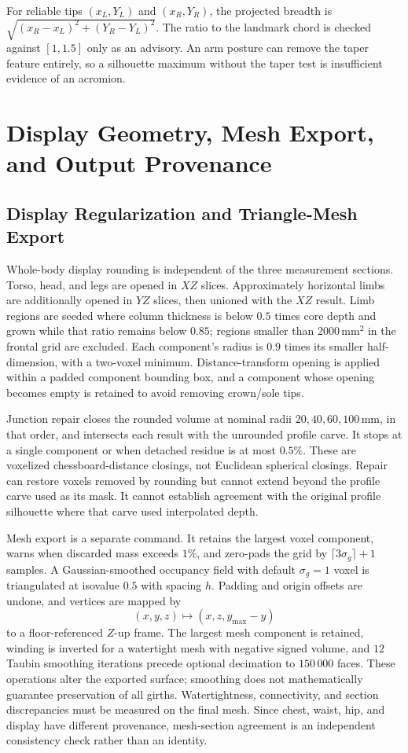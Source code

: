 \documentclass[11pt,a4paper]{article}
\numberwithin{equation}{section}
\begin{document}
For reliable tips $(x_L,Y_L)$ and $(x_R,Y_R)$, the projected breadth is $\sqrt{(x_R-x_L)^2+(Y_R-Y_L)^2}$. The ratio to the landmark chord is checked against $[1,1.5]$ only as an advisory. An arm posture can remove the taper feature entirely, so a silhouette maximum without the taper test is insufficient evidence of an acromion.

\section{Display Geometry, Mesh Export, and Output Provenance}
\subsection{Display Regularization and Triangle-Mesh Export}
\label{subsec:mesh_export}
Whole-body display rounding is independent of the three measurement sections. Torso, head, and legs are opened in $XZ$ slices. Approximately horizontal limbs are additionally opened in $YZ$ slices, then unioned with the $XZ$ result. Limb regions are seeded where column thickness is below $0.5$ times core depth and grown while that ratio remains below $0.85$; regions smaller than $2000$\,mm$^2$ in the frontal grid are excluded. Each component's radius is $0.9$ times its smaller half-dimension, with a two-voxel minimum. Distance-transform opening is applied within a padded component bounding box, and a component whose opening becomes empty is retained to avoid removing crown/sole tips.

Junction repair closes the rounded volume at nominal radii $20,40,60,100$\,mm, in that order, and intersects each result with the unrounded profile carve. It stops at a single component or when detached residue is at most $0.5\%$. These are voxelized chessboard-distance closings, not Euclidean spherical closings. Repair can restore voxels removed by rounding but cannot extend beyond the profile carve used as its mask. It cannot establish agreement with the original profile silhouette where that carve used interpolated depth.

Mesh export is a separate command. It retains the largest voxel component, warns when discarded mass exceeds $1\%$, and zero-pads the grid by $\lceil3\sigma_g\rceil+1$ samples. A Gaussian-smoothed occupancy field with default $\sigma_g=1$ voxel is triangulated at isovalue $0.5$ with spacing $h$. Padding and origin offsets are undone, and vertices are mapped by
\begin{equation}
(x,y,z)\mapsto(x,z,y_{\max}-y)
\end{equation}
to a floor-referenced $Z$-up frame. The largest mesh component is retained, winding is inverted for a watertight mesh with negative signed volume, and $12$ Taubin smoothing iterations precede optional decimation to $150\,000$ faces. These operations alter the exported surface; smoothing does not mathematically guarantee preservation of all girths. Watertightness, connectivity, and section discrepancies must be measured on the final mesh. Since chest, waist, hip, and display have different provenance, mesh-section agreement is an independent consistency check rather than an identity.
\end{document}
